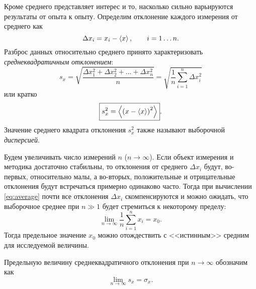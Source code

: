 
Кроме среднего представляет интерес и то, насколько сильно варьируются
результаты от опыта к опыту. Определим отклонение каждого измерения от среднего как
\[
\Delta x_{i}=x_{i}-\left<x\right>,\qquad i=1\ldots n.
\]
Разброс данных относительно среднего принято характеризовать
\emph{среднеквадратичным отклонением}:
\begin{equation}
s_{x}=\sqrt{\frac{\Delta x_{1}^{2}+\Delta x_{2}^{2}+\ldots+\Delta
x_{n}^{2}}{n}}=\sqrt{\frac{1}{n}\sum\limits _{i=1}^{n}\Delta
x_{i}^{2}}\label{eq:sigma}
\end{equation}
или кратко
\begin{equation}
\boxed{s_{x}^{2}=\left<\left(x-\left<x\right>\right)^{2}\right>}.\label{eq:sigma_s}
\end{equation}
Значение среднего квадрата отклонения $s_{x}^{2}$ также называют
выборочной \emph{дисперсией}.

%

Будем увеличивать число измерений $n$ ($n\to \infty$). Если объект измерения и методика
достаточно стабильны, то отклонения от среднего $\Delta x_i$ будут, во-первых,
относительно малы, а во-вторых, положительные и отрицательные отклонения будут
встречаться примерно одинаково часто. Тогда при вычислении \eqref{eq:average}
почти все отклонения $\Delta x_i$ скомпенсируются и можно ожидать,
что выборочное среднее при $n\gg 1$ будет стремиться к некоторому пределу:
\[
\lim_{n\to\infty}\frac{1}{n}\sum_{i=1}^{n}x_{i}=x_{0}.
\]
Тогда предельное значение $x_{0}$ можно отождествить с <<истинным>> средним
для исследуемой величины.

Предельную величину среднеквадратичного отклонения при $n\to\infty$
обозначим как
\[
\lim\limits _{n\to\infty}s_{x} = \sigma_{x}.
\]

